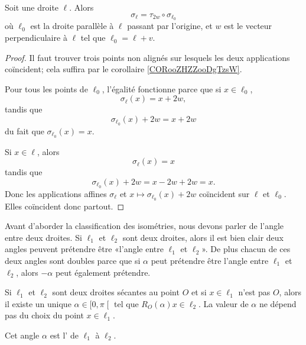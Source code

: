 \begin{lemma}   \label{LEMooVOJLooCFgdNG}
    Soit une droite \( \ell\). Alors
    \begin{equation}
        \sigma_{\ell}=\tau_{2w}\circ\sigma_{\ell_0}
    \end{equation}
    où \( \ell_0\) est la droite parallèle à \( \ell\) passant par l'origine, et \( w\) est le vecteur perpendiculaire à \( \ell\) tel que \( \ell_0=\ell+v\).
\end{lemma}

\begin{proof}
    Il faut trouver trois points non alignés sur lesquels les deux applications coïncident; cela suffira par le corollaire \ref{CORooZHZZooDgTzsW}. 

    Pour tous les points de \( \ell_0\), l'égalité fonctionne parce que si \( x\in\ell_0\),
    \begin{equation}
        \sigma_{\ell}(x)=x+2w,
    \end{equation}
    tandis que
    \begin{equation}
        \sigma_{\ell_0}(x)+2w=x+2w
    \end{equation}
    du fait que \( \sigma_{\ell_0}(x)=x\).

    Si \( x\in\ell\), alors
    \begin{equation}
        \sigma_{\ell}(x)=x
    \end{equation}
    tandis que
    \begin{equation}
        \sigma_{\ell_0}(x)+2w=x-2w+2w=x.
    \end{equation}
    Donc les applications affines \( \sigma_{\ell}\) et \( x\mapsto \sigma_{\ell_0}(x)+2w\) coïncident sur \( \ell\) et \( \ell_0\). Elles coïncident donc partout.
\end{proof}

Avant d'aborder la classification des isométries, nous devons parler de l'angle entre deux droites. Si \( \ell_1\) et \( \ell_2\) sont deux droites, alors il est bien clair deux angles peuvent prétendre être «l'angle entre \( \ell_1\) et \( \ell_2\)». De plus chacun de ces deux angles sont doubles parce que si \( \alpha\) peut prétendre être l'angle entre \( \ell_1\) et \( \ell_2\), alors \( -\alpha\) peut également prétendre.

\begin{lemmaDef}        \label{DEFooEGKOooRPGOAs}
    Si \( \ell_1\) et \( \ell_2\) sont deux droites sécantes au point \( O\) et si \( x\in\ell_1\) n'est pas \( O\), alors il existe un unique \( \alpha\in \mathopen[ 0 , \pi \mathclose[\) tel que \( R_O(\alpha)x\in \ell_2\). La valeur de \( \alpha\) ne dépend pas du choix du point \( x\in \ell_1\).

        Cet angle \( \alpha\) est l' de \( \ell_1\) à \( \ell_2\).
\end{lemmaDef}

